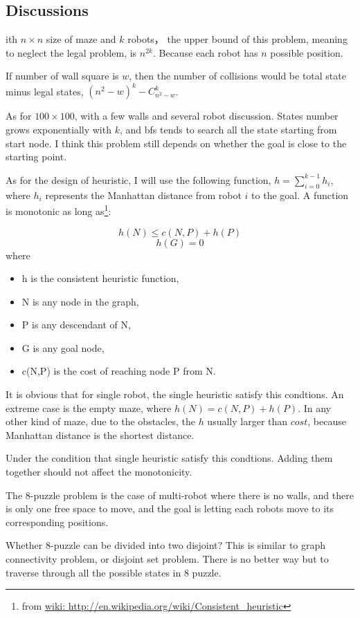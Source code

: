 \documentclass{article}
\begin{document}
\subsection{Discussions}
ith $n\times n$ size of maze and $k$ robots， the upper bound of this problem, meaning to neglect the legal problem, is $n^{2k}$. Because each robot has $n$ possible position.

If number of wall square is $w$, then the number of collisions would be total state minus legal states, $(n^2-w)^k - C_{n^2-w}^k$. 

As for $100\times100$, with a few walls and several robot discussion. States number grows exponentially with $k$, and bfs tends to search all the state starting from start node. I think this problem still depends on whether the goal is close to the starting point.

As for the design of heuristic, I will use the following function,
$h = \sum^{k-1}_{i=0}h_i$, where $h_i$ represents the Manhattan distance from robot $i$ to the goal. A function is monotonic as long as\footnote{from \url{wiki: http://en.wikipedia.org/wiki/Consistent_heuristic}}:

$$h(N) \leq c(N,P)+h(P) $$
$$h(G)=0$$
where

\begin{itemize}
\item h is the consistent heuristic function,
\item N is any node in the graph,
\item P is any descendant of N,
\item G is any goal node,
\item c(N,P) is the cost of reaching node P from N.
\end{itemize}

It is obvious that for single robot, the single heuristic satisfy this condtions. An extreme case is the empty maze, where $h(N) = c(N,P)+h(P) $. In any other kind of maze, due to the obstacles, the $h$ usually larger than $cost$, because Manhattan distance is the shortest distance.

Under the condition that single heuristic satisfy this condtions. Adding them together should not affect the monotonicity.

The 8-puzzle problem is the case of multi-robot where there is no walls, and there is only one free space to move, and the goal is letting each robots move to its corresponding positions.

Whether 8-puzzle can be divided into two disjoint? This is similar to graph connectivity problem, or disjoint set problem. There is no better way but to traverse through all the possible states in 8 puzzle.
\end{document}
